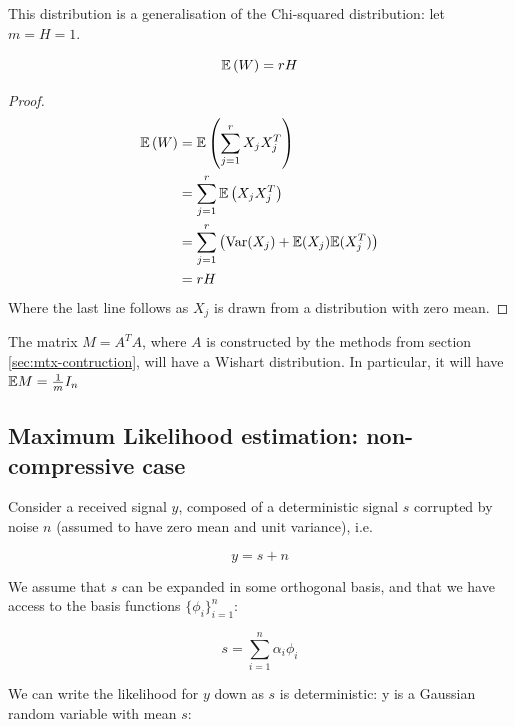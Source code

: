 \documentclass{article}
\begin{document}
\begin{remark}
This distribution is a generalisation of the Chi-squared distribution: let \(m = H = 1\). 
\end{remark}

\begin{theorem}
\begin{equation}
{\mathbb{E}}\left(W\right) = rH
\end{equation}
\end{theorem}
\begin{proof}
\begin{align*}
{\mathbb{E}}\left(W\right) &= {\mathbb{E}}\left(\sum_{j=1}^r X_j X_j^T\right) \\
&= \sum_{j=1}^r {\mathbb{E}}\left(X_jX_j^T\right) \\
&= \sum_{j=1}^r \left( \mathrm{Var}(X_j) + {\mathbb{E}}(X_j) {\mathbb{E}}(X_j^T)   \right) \\
&= rH 
\end{align*}
Where the last line follows as \(X_j\) is drawn from a distribution with zero mean.
\end{proof}

\begin{remark}
The matrix \(M = A^TA\), where \(A\) is constructed by the methods from section \ref{sec:mtx-contruction}, will have a Wishart distribution. In particular, it will have \({\mathbb{E}} M = \frac{1}{m}I_n\) 
\end{remark}

\subsection{Maximum Likelihood estimation: non-compressive case}

Consider a received signal \(y\), composed of a deterministic signal \(s\) corrupted by noise \(n\) (assumed to have zero mean and unit variance), i.e.

\begin{equation}
y = s + n
\end{equation}

We assume that \(s\) can be expanded in some orthogonal basis, and that we have access to the basis functions \(\{\phi_i\}_{i=1}^n\):

\begin{equation}
s = \sum_{i=1}^n \alpha_i \phi_i
\end{equation}

We can write the likelihood for \(y\) down as \(s\) is deterministic: y is a Gaussian random variable with mean \(s\):
\end{document}
